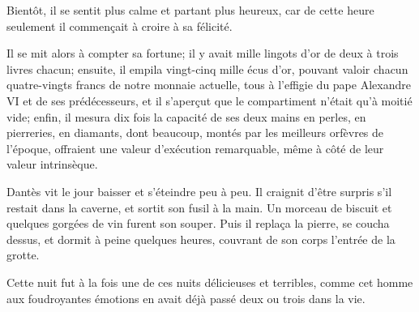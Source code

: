 Bientôt, il se sentit plus calme et partant plus heureux, car de cette heure seulement il commençait à croire à sa félicité.

Il se mit alors à compter sa fortune; il y avait mille lingots d'or de deux à trois livres chacun; ensuite, il empila vingt-cinq mille écus d'or, pouvant valoir chacun quatre-vingts francs de notre monnaie actuelle, tous à l'effigie du pape Alexandre VI et de ses prédécesseurs, et il s'aperçut que le compartiment n'était qu'à moitié vide; enfin, il mesura dix fois la capacité de ses deux mains en perles, en pierreries, en diamants, dont beaucoup, montés par les meilleurs orfèvres de l'époque, offraient une valeur d'exécution remarquable, même à côté de leur valeur intrinsèque.

Dantès vit le jour baisser et s'éteindre peu à peu. Il craignit d'être surpris s'il restait dans la caverne, et sortit son fusil à la main. Un morceau de biscuit et quelques gorgées de vin furent son souper. Puis il replaça la pierre, se coucha dessus, et dormit à peine quelques heures, couvrant de son corps l'entrée de la grotte.

Cette nuit fut à la fois une de ces nuits délicieuses et terribles, comme cet homme aux foudroyantes émotions en avait déjà passé deux ou trois dans la vie.



